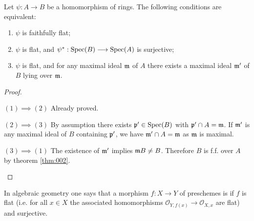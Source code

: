 \documentclass[../main]{subfiles}
\begin{document}
\begin{partheorem}\label{thm:003}
Let $\psi: A \longrightarrow B$ be a homomorphism of rings. The following conditions are equivalent:
\begin{enumerate}[label=(\arabic*)]
    \item $\psi$ is faithfully flat;
    \item $\psi$ is flat, and $\psi^\ast:\operatorname{Spec}(B) \longrightarrow \operatorname{Spec}(A)$ is surjective;
    \item $\psi$ is flat, and for any maximal ideal $\mathfrak{m}$ of $A$ there exists a maximal ideal $\mathfrak{m}'$ of $B$ lying over $\mathfrak{m}$.
\end{enumerate}
\end{partheorem}
\newpage 
\begin{proof}\phantom{,}
\begin{implyenumerate}
    \item[$(1)\implies(2)$] Already proved.
    \item[$(2)\implies(3)$] By assumption there exists $\mathfrak{p}' \in \operatorname{Spec}(B)$ with $\mathfrak{p}' \cap A = \mathfrak{m}$. If $\mathfrak{m}'$ is any maximal ideal of $B$ containing $\mathfrak{p}'$, we have $\mathfrak{m}' \cap A = \mathfrak{m}$ as $\mathfrak{m}$ is maximal. 
    \item[$(3)\implies(1)$] The existence of $\mathfrak{m}'$ implies $\mathfrak{m}B \ne B$. Therefore $B$ is f.f. over $A$ by theorem \ref{thm:002}.
\end{implyenumerate}
\end{proof}

\begin{remark}\label{rem:04.02}
In algebraic geometry one says that a morphism $f : X \longrightarrow Y$ of preschemes is  if $f$ is flat (i.e. for all $x \in X$ the associated homomorphisms $\mathcal{O}_{Y, f(x)} \longrightarrow \mathcal{O}_{X,x}$ are flat) and surjective.
\end{remark}
\end{document}
